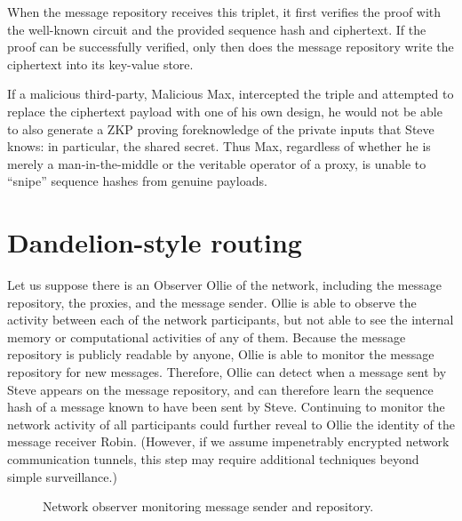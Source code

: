 When the message repository receives this triplet, it first verifies the proof with the well-known circuit and the provided sequence hash and ciphertext. If the proof can be successfully verified, only then does the message repository write the ciphertext into its key-value store.

If a malicious third-party, Malicious Max, intercepted the triple and attempted to replace the ciphertext payload with one of his own design, he would not be able to also generate a ZKP proving foreknowledge of the private inputs that Steve knows: in particular, the shared secret. Thus Max, regardless of whether he is merely a man-in-the-middle or the veritable operator of a proxy, is unable to ``snipe'' sequence hashes from genuine payloads.

\section{Dandelion-style routing}\label{dandelion-style-routing}

Let us suppose there is an Observer Ollie of the network, including the message repository, the proxies, and the message sender. Ollie is able to observe the activity between each of the network participants, but not able to see the internal memory or computational activities of any of them. Because the message repository is publicly readable by anyone, Ollie is able to monitor the message repository for new messages. Therefore, Ollie can detect when a message sent by Steve appears on the message repository, and can therefore learn the sequence hash of a message known to have been sent by Steve. Continuing to monitor the network activity of all participants could further reveal to Ollie the identity of the message receiver Robin. (However, if we assume impenetrably encrypted network communication tunnels, this step may require additional techniques beyond simple surveillance.)

\begin{figure}[h!]
    \centering
    \caption{Network observer monitoring message sender and repository.}
    \label{fig:observer}
\end{figure}

